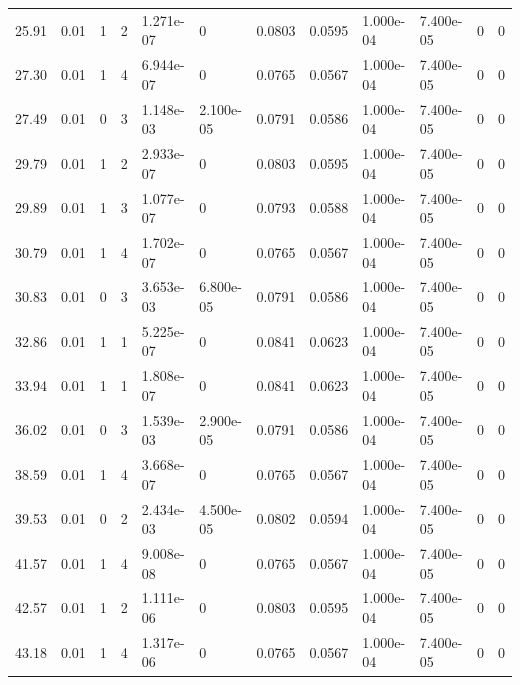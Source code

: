 \documentclass[preview]{standalone}
\begin{document}
{{\begin{tabular}{L{1.2cm}C{1.2cm} C{0.3cm}C{0.5cm} C{1.4cm}C{1.4cm} C{1.4cm}C{1.4cm} C{1.6cm}C{1.6cm} C{1.6cm}C{1.6cm}}
  25.91  &  0.01  & 1     &  2 &  1.271e-07  & 0  &  0.0803&   0.0595& 1.000e-04 & 7.400e-05   &  0 & 0  \\ 
  27.30  &  0.01  & 1     &  4 &  6.944e-07  & 0  &  0.0765&   0.0567& 1.000e-04 & 7.400e-05   &  0 & 0  \\ 
  27.49  &  0.01  & 0     &  3 &  1.148e-03  & 2.100e-05  &  0.0791&   0.0586& 1.000e-04 & 7.400e-05   &  0 & 0  \\ 
  29.79  &  0.01  & 1     &  2 &  2.933e-07  & 0  &  0.0803&   0.0595& 1.000e-04 & 7.400e-05   &  0 & 0  \\ 
  29.89  &  0.01  & 1     &  3 &  1.077e-07  & 0  &  0.0793&   0.0588& 1.000e-04 & 7.400e-05   &  0 & 0  \\ 
  30.79  &  0.01  & 1     &  4 &  1.702e-07  & 0  &  0.0765&   0.0567& 1.000e-04 & 7.400e-05   &  0 & 0  \\ 
  30.83  &  0.01  & 0     &  3 &  3.653e-03  & 6.800e-05  &  0.0791&   0.0586& 1.000e-04 & 7.400e-05   &  0 & 0  \\ 
  32.86  &  0.01  & 1     &  1 &  5.225e-07  & 0  &  0.0841&   0.0623& 1.000e-04 & 7.400e-05   &  0 & 0  \\ 
  33.94  &  0.01  & 1     &  1 &  1.808e-07  & 0  &  0.0841&   0.0623& 1.000e-04 & 7.400e-05   &  0 & 0  \\ 
  36.02  &  0.01  & 0     &  3 &  1.539e-03  & 2.900e-05  &  0.0791&   0.0586& 1.000e-04 & 7.400e-05   &  0 & 0  \\ 
  38.59  &  0.01  & 1     &  4 &  3.668e-07  & 0  &  0.0765&   0.0567& 1.000e-04 & 7.400e-05   &  0 & 0  \\ 
  39.53  &  0.01  & 0     &  2 &  2.434e-03  & 4.500e-05  &  0.0802&   0.0594& 1.000e-04 & 7.400e-05   &  0 & 0  \\ 
  41.57  &  0.01  & 1     &  4 &  9.008e-08  & 0  &  0.0765&   0.0567& 1.000e-04 & 7.400e-05   &  0 & 0  \\ 
  42.57  &  0.01  & 1     &  2 &  1.111e-06  & 0  &  0.0803&   0.0595& 1.000e-04 & 7.400e-05   &  0 & 0  \\ 
  43.18  &  0.01  & 1     &  4 &  1.317e-06  & 0  &  0.0765&   0.0567& 1.000e-04 & 7.400e-05   &  0 & 0  \\ 
\hline 
\end{tabular} 

}}
\end{document}
